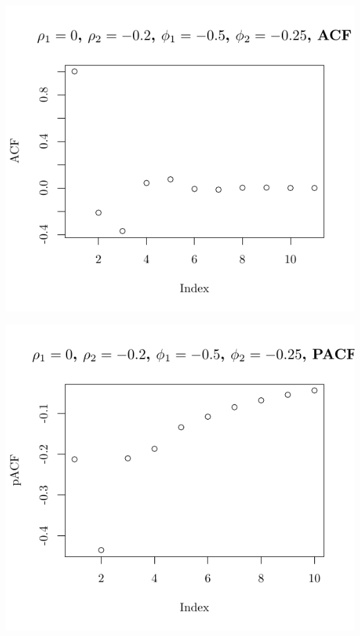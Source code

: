 \documentclass[10pt]{paper}\usepackage[]{graphicx}\usepackage[]{color}
\makeatletter
\def\maxwidth{ %
  \ifdim\Gin@nat@width>\linewidth
    \linewidth
  \else
    \Gin@nat@width
  \fi
}
\newenvironment{knitrout}{}{} %
\makeatother
\begin{document}
\begin{knitrout}
{\centering \includegraphics[width=\maxwidth]{figure/graphics-plotter-73} 

}




{\centering \includegraphics[width=\maxwidth]{figure/graphics-plotter-74} 

}





\end{knitrout}
\end{document}
